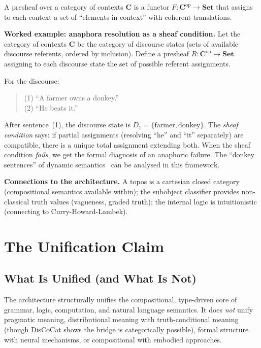 \documentclass[12pt,a4paper]{article}
\begin{document}
A presheaf over a category of contexts $\mathbf{C}$ is a functor
$F \colon \mathbf{C}^{\mathrm{op}} \to \mathbf{Set}$ that assigns to each
context a set of ``elements in context'' with coherent translations.

\textbf{Worked example: anaphora resolution as a sheaf condition.} Let the
category of contexts $\mathbf{C}$ be the category of discourse states (sets
of available discourse referents, ordered by inclusion). Define a presheaf
$R \colon \mathbf{C}^{\mathrm{op}} \to \mathbf{Set}$ assigning to each
discourse state the set of possible referent assignments.

For the discourse:
\begin{quote}
(1) ``A farmer owns a donkey.'' \\
(2) ``He beats it.''
\end{quote}

After sentence~(1), the discourse state is $D_1 = \{\text{farmer},
\text{donkey}\}$. The \emph{sheaf condition} says: if partial assignments
(resolving ``he'' and ``it'' separately) are compatible, there is a unique
total assignment extending both. When the sheaf condition \emph{fails}, we
get the formal diagnosis of an anaphoric failure. The ``donkey sentences'' of
dynamic semantics~\cite{Kamp1981,Heim1982} can be analysed in this framework.

\textbf{Connections to the architecture.} A topos is a cartesian closed
category (compositional semantics available within); the subobject classifier
provides non-classical truth values (vagueness, graded truth); the internal
logic is intuitionistic (connecting to Curry-Howard-Lambek).

\section{The Unification Claim}

\subsection{What Is Unified (and What Is Not)}

The architecture structurally unifies the compositional, type-driven core of
grammar, logic, computation, and natural language semantics. It does
\emph{not} unify pragmatic meaning, distributional meaning with
truth-conditional meaning (though DisCoCat shows the bridge is categorically
possible), formal structure with neural mechanisms, or compositional with
embodied approaches.
\end{document}
